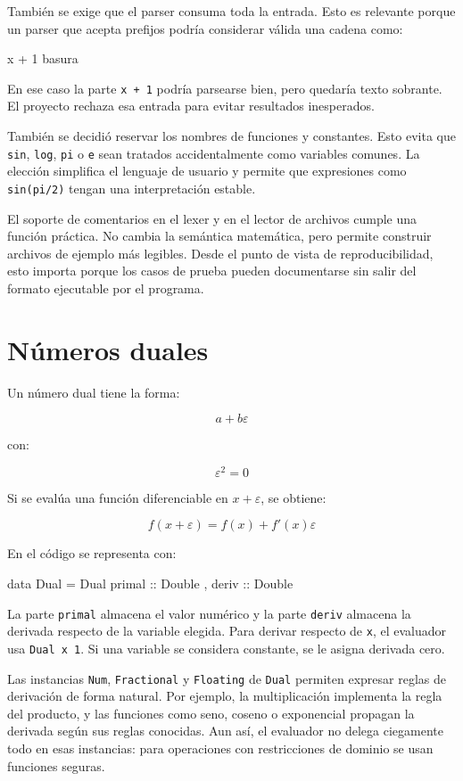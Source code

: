 \documentclass[11pt,a4paper]{article}
\newenvironment{lstlisting}{\verbatim}{\endverbatim}
\begin{document}
También se exige que el parser consuma toda la entrada. Esto es relevante porque un parser que acepta prefijos podría considerar válida una cadena como:

\begin{lstlisting}
x + 1 basura
\end{lstlisting}

En ese caso la parte \texttt{x + 1} podría parsearse bien, pero quedaría texto sobrante. El proyecto rechaza esa entrada para evitar resultados inesperados.

También se decidió reservar los nombres de funciones y constantes. Esto evita que \texttt{sin}, \texttt{log}, \texttt{pi} o \texttt{e} sean tratados accidentalmente como variables comunes. La elección simplifica el lenguaje de usuario y permite que expresiones como \texttt{sin(pi/2)} tengan una interpretación estable.

El soporte de comentarios en el lexer y en el lector de archivos cumple una función práctica. No cambia la semántica matemática, pero permite construir archivos de ejemplo más legibles. Desde el punto de vista de reproducibilidad, esto importa porque los casos de prueba pueden documentarse sin salir del formato ejecutable por el programa.

\section{Números duales}

Un número dual tiene la forma:

\[
a + b\varepsilon
\]

con:

\[
\varepsilon^2 = 0
\]

Si se evalúa una función diferenciable en \(x + \varepsilon\), se obtiene:

\[
f(x + \varepsilon) = f(x) + f'(x)\varepsilon
\]

En el código se representa con:

\begin{lstlisting}
data Dual = Dual
  { primal :: Double
  , deriv  :: Double
  }
\end{lstlisting}

La parte \texttt{primal} almacena el valor numérico y la parte \texttt{deriv} almacena la derivada respecto de la variable elegida. Para derivar respecto de \texttt{x}, el evaluador usa \texttt{Dual x 1}. Si una variable se considera constante, se le asigna derivada cero.

Las instancias \texttt{Num}, \texttt{Fractional} y \texttt{Floating} de \texttt{Dual} permiten expresar reglas de derivación de forma natural. Por ejemplo, la multiplicación implementa la regla del producto, y las funciones como seno, coseno o exponencial propagan la derivada según sus reglas conocidas. Aun así, el evaluador no delega ciegamente todo en esas instancias: para operaciones con restricciones de dominio se usan funciones seguras.
\end{document}
